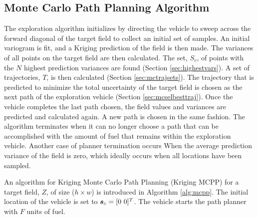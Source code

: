 \subsection{Monte Carlo Path Planning Algorithm}
The exploration algorithm initializes by directing the vehicle to sweep across the forward diagonal of the target field to collect an initial set of samples. An initial variogram is fit, and a Kriging prediction of the field is then made. The variances of all points on the target field are then calculated. The set, $S_{v}$, of points with the $N$ highest prediction variances are found (Section \ref{sec:highestvars}). A set of trajectories, $T$, is then calculated (Section \ref{sec:mctrajsets}). The trajectory that is predicted to minimize the total uncertainty of the target field is chosen as the next path of the exploration vehicle (Section \ref{sec:mcselbesttraj}). Once the vehicle completes the last path chosen, the field values and variances are predicted and calculated again. A new path is chosen in the same fashion. The algorithm terminates when it can no longer choose a path that can be accomplished with the amount of fuel that remains within the exploration vehicle. Another case of planner termination occurs When the average prediction variance of the field is zero, which ideally occurs when all locations have been sampled.

An algorithm for Kriging Monte Carlo Path Planning (Kriging MCPP) for a target field, $Z$, of size ($h\times w$) is introduced in Algorithm \ref{alg:mcpp}. The initial location of the vehicle is set to $\vect{s}_{c} = [0\ 0]^T$. The vehicle starts the path planner with $F$ units of fuel.


